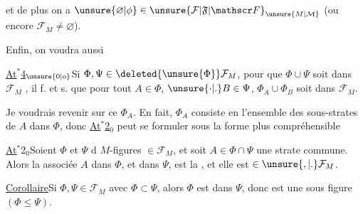 et de plus on a $\unsure{\varnothing|\phi}\in\unsure{\mathcal F|\mathfrak F|\mathscr F}_{\unsure{M|\mathcal{M}}}$ (ou encore $\mathcal F_M\neq\varnothing$).

Enfin, on voudra aussi

\uline{At$^{*}$4}$_{\unsure{0|o}}$\quad Si $\Phi,\Psi\in\deleted{\unsure{\Phi}}\mathcal F_M$, pour que $\Phi\cup\Psi$ soit  dans $\mathcal F_M$ , il f. et s. que pour tout $A\in\Phi$, $\unsure{\cdot|.}B\in\Psi$, $\Phi_A\cup\Phi_B$ soit dans $\mathcal F_M$.

Je voudrais revenir sur ce $\Phi_A$. En fait, $\Phi_A$ consiste en l'ensemble des sous-strates de $A$ dans $\Phi$, donc \uline{At$^{*}$2}$_0$ peut se formuler sous la forme plus compréhensible

\uline{At$^{*}$}2$_0$\quad Soient $\Phi$ et $\Psi$ d $M$-figures $\in\mathcal F_M$, et soit $A\in\Phi\cap\Psi$ une strate commune. Alors la  associée  $A$ dans $\Phi$, et dans $\Psi$, est la , et elle est $\in\unsure{,|.}\mathcal F_M$.

\uline{Corollaire}\quad Si $\Phi,\Psi\in\mathcal F_M$ avec $\Phi\subset\Psi$, alors $\Phi$ est  dans $\Psi$, donc est une sous figure $(\Phi\leq\Psi)$.
